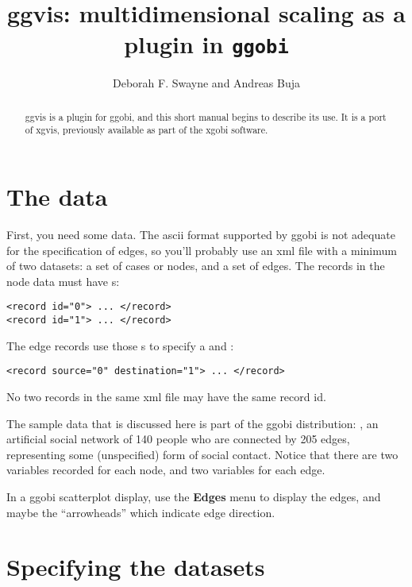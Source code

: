\documentclass[11pt]{article}
\begin{document}
\title{ggvis: multidimensional scaling as a plugin in {\tt ggobi}}
\author{Deborah F. Swayne and Andreas Buja}
\maketitle

\begin{abstract}
ggvis is a plugin for ggobi, and this short manual begins
to describe its use.  It is a port of xgvis,  previously
available as part of the xgobi software.
\end{abstract}

\section{The data}

First, you need some data.  The ascii format supported by ggobi is not
adequate for the specification of edges, so you'll probably use an xml
file with a minimum of two datasets:  a set of cases or nodes, and a set
of edges.  The records in the node data must have
s:

\begin{verbatim}
<record id="0"> ... </record>
<record id="1"> ... </record>
\end{verbatim}

The edge records use those s to specify a
 and :

\begin{verbatim}
<record source="0" destination="1"> ... </record>
\end{verbatim}

No two records in the same xml file may have the same record id.

The sample data that is discussed here is part of the ggobi distribution:
, an artificial social network of 140 people who are
connected by 205 edges, representing some (unspecified) form of social
contact.  Notice that there are two variables recorded for each node,
and two variables for each edge.

In a ggobi scatterplot display, use the {\bf Edges} menu to
display the edges, and maybe the ``arrowheads'' which indicate
edge direction.

\section{Specifying the datasets}
\end{document}
